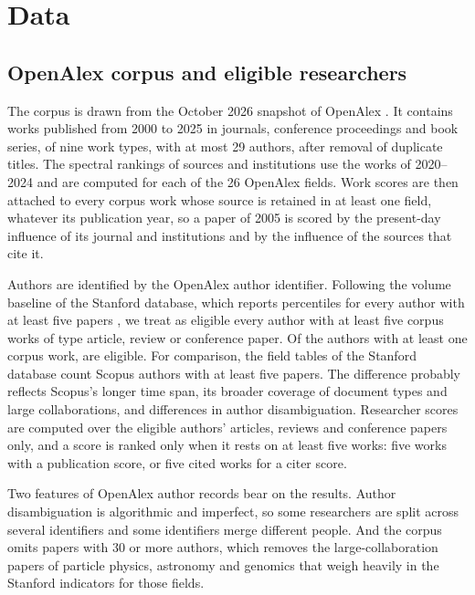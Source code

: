 \section{Data}
\label{sec:data}

\subsection{OpenAlex corpus and eligible researchers}

The corpus is drawn from the October 2026 snapshot of OpenAlex \citep{priemOpenAlexFullyopenIndex2022}. It contains works published from 2000 to 2025 in journals, conference proceedings and book series, of nine work types, with at most 29 authors, after removal of duplicate titles. The spectral rankings of sources and institutions use the works of 2020--2024 and are computed for each of the 26 OpenAlex fields. Work scores are then attached to every corpus work whose source is retained in at least one field, whatever its publication year, so a paper of 2005 is scored by the present-day influence of its journal and institutions and by the influence of the sources that cite it.

Authors are identified by the OpenAlex author identifier. Following the volume baseline of the Stanford database, which reports percentiles for every author with at least five papers \citep{ioannidisStandardizedCitationMetrics2019a}, we treat as eligible every author with at least five corpus works of type article, review or conference paper. Of the \NOaAuthors{} authors with at least one corpus work, \NOaEligible{} are eligible. For comparison, the field tables of the Stanford database count \NStPopul{} Scopus authors with at least five papers. The difference probably reflects Scopus's longer time span, its broader coverage of document types and large collaborations, and differences in author disambiguation. Researcher scores are computed over the eligible authors' articles, reviews and conference papers only, and a score is ranked only when it rests on at least five works: five works with a publication score, or five cited works for a citer score.

Two features of OpenAlex author records bear on the results. Author disambiguation is algorithmic and imperfect, so some researchers are split across several identifiers and some identifiers merge different people. And the corpus omits papers with 30 or more authors, which removes the large-collaboration papers of particle physics, astronomy and genomics that weigh heavily in the Stanford indicators for those fields.

